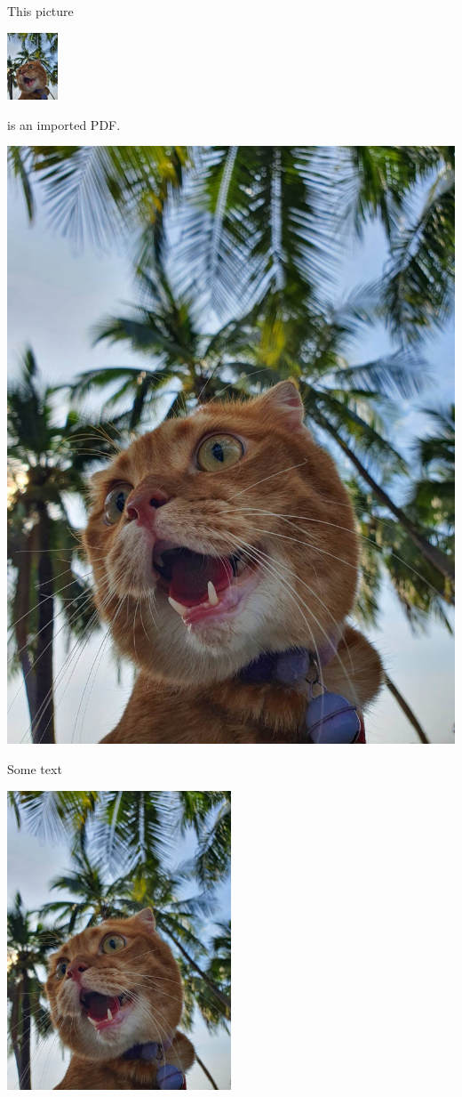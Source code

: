\documentclass{article}
\begin{document}
This picture
\begin{center}
	\includegraphics[height=2cm]{garfield}
\end{center}
is an imported PDF.

\begin{center}
  \includegraphics[height = 0.5\textheight]{garfield}
\end{center}
Some text
\begin{center}
  \includegraphics[width = 0.5\textwidth]{garfield.JPG}
\end{center}
\end{document}
